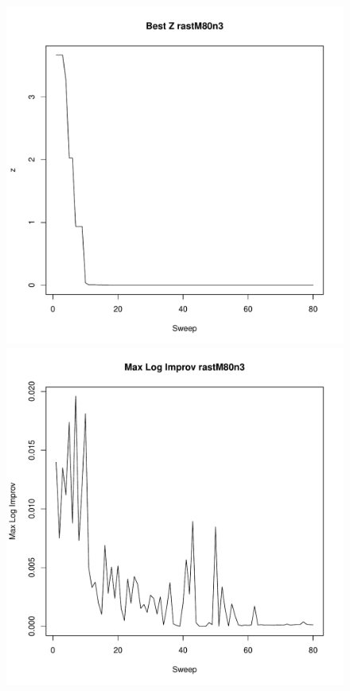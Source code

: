\documentclass{article}
\begin{document}
\clearpage

\begin{figure}
        \begin{center}
                \begin{minipage}[h!]{0.49\textwidth}
                        \includegraphics[width=1.0\textwidth]{rastM80n3Coord.pdf}
                \end{minipage}
                \begin{minipage}[h!]{0.49\textwidth}
                        \includegraphics[width=1.0\textwidth]{rastM80n3MLI.pdf}
                \end{minipage}
        \end{center}
\end{figure}
\end{document}
